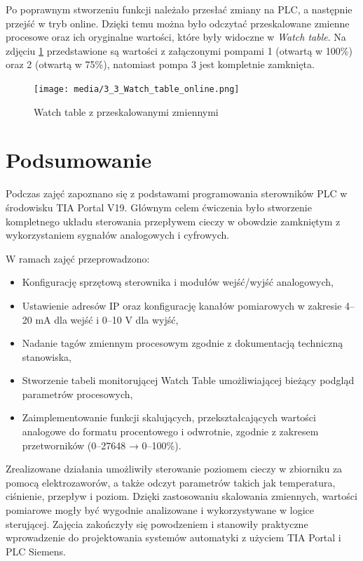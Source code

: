 \documentclass{article}
\begin{document}
Po poprawnym stworzeniu funkcji należało przesłać zmiany na PLC, a następnie przejść w tryb online. Dzięki temu można było odczytać przeskalowane zmienne procesowe oraz ich oryginalne wartości, które były widoczne w \textit{Watch table}. Na zdjęciu \ref{fig:zdj14} przedstawione są wartości z załączonymi pompami 1 (otwartą w 100\%) oraz 2 (otwartą w 75\%), natomiast pompa 3 jest kompletnie zamknięta.
\begin{figure}[H]
    \centering
    \texttt{[image: media/3\_3\_Watch\_table\_online.png]}
    \caption{Watch table z przeskalowanymi zmiennymi}
    \label{fig:zdj14}
\end{figure}

\newpage
\section{Podsumowanie}
Podczas zajęć zapoznano się z podstawami programowania sterowników PLC w środowisku TIA Portal V19. Głównym celem ćwiczenia było stworzenie kompletnego układu sterowania przepływem cieczy w obowdzie zamkniętym z wykorzystaniem sygnałów analogowych i cyfrowych.

W ramach zajęć przeprowadzono:
\begin{itemize}
    \item Konfigurację sprzętową sterownika i modułów wejść/wyjść analogowych,
    \item Ustawienie adresów IP oraz konfigurację kanałów pomiarowych w zakresie 4–20 mA dla wejść i 0–10 V dla wyjść,
    \item Nadanie tagów zmiennym procesowym zgodnie z dokumentacją techniczną stanowiska,
    \item Stworzenie tabeli monitorującej Watch Table umożliwiającej bieżący podgląd parametrów procesowych,
    \item 
    Zaimplementowanie funkcji skalujących, przekształcających wartości analogowe do formatu procentowego i odwrotnie, zgodnie z zakresem przetworników (0–27648 → 0–100\%).
\end{itemize}

Zrealizowane działania umożliwiły sterowanie poziomem cieczy w zbiorniku za pomocą elektrozaworów, a także odczyt parametrów takich jak temperatura, ciśnienie, przepływ i poziom. Dzięki zastosowaniu skalowania zmiennych, wartości pomiarowe mogły być wygodnie analizowane i wykorzystywane w logice sterującej. Zajęcia zakończyły się powodzeniem i stanowiły praktyczne wprowadzenie do projektowania systemów automatyki z użyciem TIA Portal i PLC Siemens.
\end{document}
